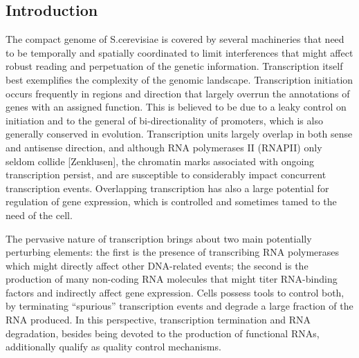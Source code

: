 \subsection{Introduction}

The compact genome of S.cerevisiae is covered by several machineries that need to be temporally and spatially coordinated to limit interferences that might affect robust reading and perpetuation of the genetic information. Transcription itself best exemplifies the complexity of the genomic landscape. Transcription initiation occurs frequently in regions and direction that largely overrun the annotations of genes with an assigned function. This is believed to be due to a leaky control on initiation and to the general of bi-directionality of promoters, which is also generally conserved in evolution. Transcription units largely overlap in both sense and antisense direction, and although RNA polymerases II (RNAPII) only seldom collide [Zenklusen], the chromatin marks associated with ongoing transcription persist, and are susceptible to considerably impact concurrent transcription events. Overlapping transcription has also a large potential for regulation of gene expression, which is controlled and sometimes tamed to the need of the cell. 

The pervasive nature of transcription brings about two main potentially perturbing elements: the first is the presence of transcribing RNA polymerases which might directly affect other DNA-related events; the second is the production of many non-coding RNA molecules that might titer RNA-binding factors and indirectly affect gene expression. Cells possess tools to control both, by terminating “spurious” transcription events and degrade a large fraction of the RNA produced. In this perspective, transcription termination and RNA degradation, besides being devoted to the production of functional RNAs, additionally qualify as quality control mechanisms. 

